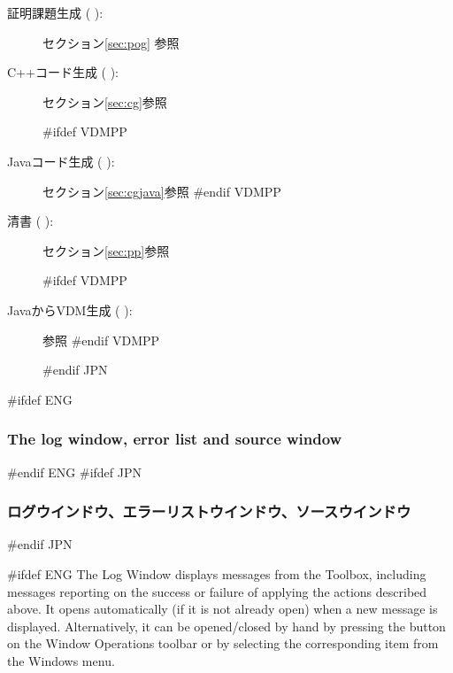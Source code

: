 \documentclass[\pformat,12pt]{article}
\newcommand{\Toolbox}{Toolbox}
\newcommand{\Toolbox}{Toolbox}
\newcommand{\guicmd}[1]{{\sf #1}}
\newcommand{\guicmd}[1]{{\gt #1}}
\begin{document}
\begin{description}
\item[\guicmd{証明課題生成} (\hspace{-1.8mm}
):] セクション\ref{sec:pog} 参照

\item[\guicmd{C++コード生成} (\hspace{-1.8mm}
):] セクション\ref{sec:cg}参照 

#ifdef VDMPP
\item[\guicmd{Javaコード生成} (\hspace{-1.8mm}
):] セクション\ref{sec:cgjava}参照
#endif VDMPP  

\item[\guicmd{清書} (\hspace{-1.8mm}
):] セクション\ref{sec:pp}参照

#ifdef VDMPP
\item[\guicmd{JavaからVDM生成} (\hspace{-1.8mm}
):] \cite{Java2VDMMan-CSK}参照 
#endif VDMPP  

#endif JPN

\end{description}

#ifdef ENG
\subsubsection{The log window, error list and source window}
#endif ENG
#ifdef JPN
\subsubsection{ログウインドウ、エラーリストウインドウ、ソースウインドウ}
#endif JPN

#ifdef ENG
The \guicmd{Log Window} displays messages from the \Toolbox, including
messages reporting on the success or failure of applying the actions
described above. It opens automatically (if it is not already open)
when a new message is displayed. Alternatively, it can be
opened/closed by hand by pressing the 
button on the \guicmd{Window Operations} toolbar or by
selecting the corresponding item from the \guicmd{Windows} menu.
\end{document}
